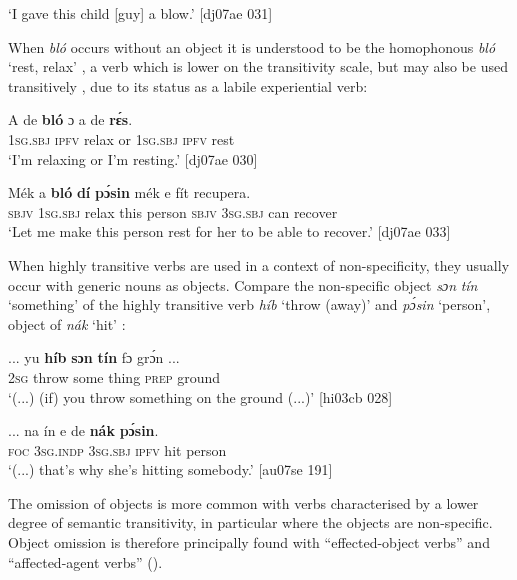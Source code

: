 \glt ‘I gave this child [guy] a blow.’ [dj07ae 031]
\z

When \textit{bló} occurs without an object it is understood to be the homophonous \textit{bló} ‘rest, relax’ , a verb which is lower on the transitivity scale, but may also be used transitively , due to its status as a labile experiential verb: 


\ea%
    \label{ex:key:1273}
    \gll A    de  \textbf{bló}    ɔ  a    de  \textbf{rɛ́s}.\\
\textsc{1sg.sbj}  \textsc{ipfv}  relax  or  \textsc{1sg.sbj}  \textsc{ipfv}  rest\\

\glt ‘I’m relaxing or I’m resting.’ [dj07ae 030]
\z


\ea%
    \label{ex:key:1274}
    \gll Mék    a    \textbf{bló}    \textbf{dí}  \textbf{pɔ́sin}  mék    e    fít  recupera.\\
\textsc{sbjv}    \textsc{1sg.sbj}  relax  this  person  \textsc{sbjv}    \textsc{3sg.sbj}  can  recover\\

\glt ‘Let me make this person rest for her to be able to recover.’ [dj07ae 033]
\z

When highly transitive verbs are used in a context of non-specificity, they usually occur with generic nouns as objects. Compare the non-specific object \textit{sɔn} \textit{tín} ‘something’ of the highly transitive verb \textit{híb} ‘throw (away)’  and \textit{pɔ́sin} ‘person’, object of \textit{nák} ‘hit’ : 


\ea%
    \label{ex:key:1275}
    \gll \op...\cp{}  yu  \textbf{híb}    \textbf{sɔn}   \textbf{tín}    fɔ  grɔ́n    \op...\cp{}\\
  {} \textsc{2sg}  throw  some  thing  \textsc{prep}  ground\\

\glt ‘(...) (if) you throw something on the ground (...)’ [hi03cb 028]
\z


\ea%
    \label{ex:key:1276}
    \gll \op...\cp{}  na  ín    e    de  \textbf{nák}  \textbf{pɔ́sin}.\\
  {} \textsc{foc}  \textsc{3sg.indp}  \textsc{3sg.sbj}  \textsc{ipfv}  hit  person\\

\glt ‘(...) that’s why she’s hitting somebody.’ [au07se 191]
\z

The omission of objects is more common with verbs characterised by a lower degree of semantic transitivity, in particular where the objects are non-specific. Object omission is therefore principally found with “effected-object verbs” \citep{Hopper1985} and “affected-agent verbs” (\citealt{Tenny1994,Naess2007}).


